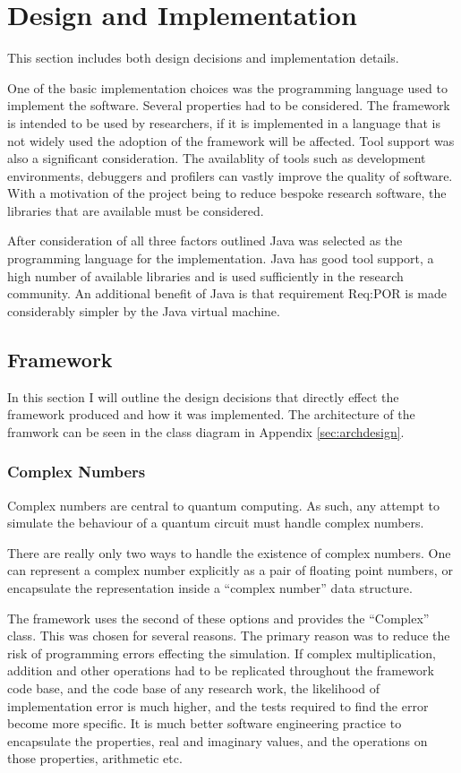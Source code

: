 \chapter{Design and Implementation}
\label{sec:desandimp}
\lstset{language=Java}
This section includes both design decisions and implementation details.

One of the basic implementation choices was the programming language used to implement the software.
Several properties had to be considered.
The framework is intended to be used by researchers, if it is implemented in a language that is not widely used the adoption of the framework will be affected.
Tool support was also a significant consideration.
The availablity of tools such as development environments, debuggers and profilers can vastly improve the quality of software.
With a motivation of the project being to reduce bespoke research software, the libraries that are available must be considered.

After consideration of all three factors outlined Java was selected as the programming language for the implementation.
Java has good tool support, a high number of available libraries and is used sufficiently in the research community.
An additional benefit of Java is that requirement Req:POR is made considerably simpler by the Java virtual machine.

\section{Framework}
In this section I will outline the design decisions that directly effect the framework produced and how it was implemented.
The architecture of the framwork can be seen in the class diagram in Appendix \ref{sec:archdesign}.

\subsection{Complex Numbers}
Complex numbers are central to quantum computing.
As such, any attempt to simulate the behaviour of a quantum circuit must handle complex numbers.

There are really only two ways to handle the existence of complex numbers.
One can represent a complex number explicitly as a pair of floating point numbers, or encapsulate the representation inside a ``complex number'' data structure.

The framework uses the second of these options and provides the ``Complex'' class.
This was chosen for several reasons.
The primary reason was to reduce the risk of programming errors effecting the simulation.
If complex multiplication, addition and other operations had to be replicated throughout the framework code base, and the code base of any research work, the likelihood of implementation error is much higher, and the tests required to find the error become more specific.
It is much better software engineering practice to encapsulate the properties, real and imaginary values, and the operations on those properties, arithmetic etc.

